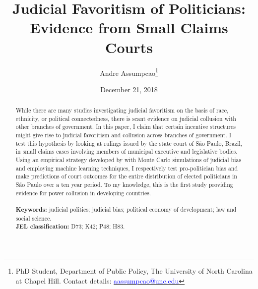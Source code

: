 \documentclass[11pt]{article}
\begin{document}
\begin{titlepage}
\title{Judicial Favoritism of Politicians: Evidence from Small Claims Courts}
\author{Andre Assumpcao\thanks{PhD Student, Department of Public Policy, The University of North Carolina at Chapel Hill. Contact details: \href{mailto:aassumpcao@unc.edu}{\textcolor{blue}{aassumpcao@unc.edu}}}}
\date{December 21, 2018}

\maketitle

\begin{abstract}
\noindent While there are many studies investigating judicial favoritism on the basis of race, ethnicity, or political connectedness, there is scant evidence on judicial collusion with other branches of government. In this paper, I claim that certain incentive structures might give rise to judicial favoritism and collusion across branches of government. I test this hypothesis by looking at rulings issued by the state court of São Paulo, Brazil, in small claims cases involving members of municipal executive and legislative bodies. Using an empirical strategy developed by \citet{AbramsJudgesVaryTheir2012} with Monte Carlo simulations of judicial bias and employing machine learning techniques, I respectively test pro-politician bias and make predictions of court outcomes for the entire distribution of elected politicians in São Paulo over a ten year period. To my knowledge, this is the first study providing evidence for power collusion in developing countries. \\
\vspace{0in} \\
\noindent\textbf{Keywords:} judicial politics; judicial bias; political economy of development; law and social science. \\

\noindent\textbf{JEL classification:} D73; K42; P48; H83. \\

\vspace{0in}
\bigskip

\end{abstract}

\setcounter{page}{0}

\thispagestyle{empty}

\end{titlepage}

\clearpage
\end{document}
